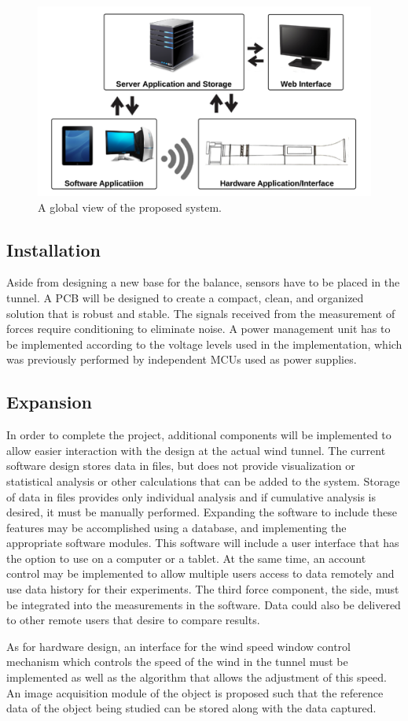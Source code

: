 	\begin{figure}[H]
		\centering
			\includegraphics[scale=0.22]{img/system-overview-global}
		\caption{A global view of the proposed system.}
	\end{figure}
	
	\subsection{Installation}
	Aside from designing a new base for the balance, sensors have
	to be placed in the tunnel. A PCB will be designed to create a compact, clean, and organized
	solution that is robust and stable. The signals received from the measurement of forces require
	conditioning to eliminate noise. A power management unit has to be implemented according to
	the voltage levels used in the implementation, which was previously performed by independent
	MCUs used as power supplies.

	\subsection{Expansion}
	In order to complete the project, additional components will be implemented to allow
	easier interaction with the design at the actual wind tunnel. The current software design stores data in files, but
	does not provide visualization or statistical analysis or other calculations that can 
	be added to the system. Storage of data in
	files provides only individual analysis and if cumulative analysis is desired, it must be manually
	performed. Expanding the software to include these features may be accomplished using a
	database, and implementing the appropriate software modules. This software
	will include a user interface that has the option to use on a computer or a tablet. At the
	same time, an account control may be implemented to allow multiple users access to
	data remotely and use data history for their experiments. The third force component, the side,
	must be integrated into the measurements in the software. Data could also be delivered to other
	remote users that desire to compare results.

	As for hardware design, an interface for the wind speed window control mechanism which controls the 
	speed of the wind in the tunnel must be implemented as well as the algorithm that allows the 
	adjustment of this speed.
	An image acquisition module of the object is proposed such that the reference data of the object
	being studied can be stored along with the data captured.
